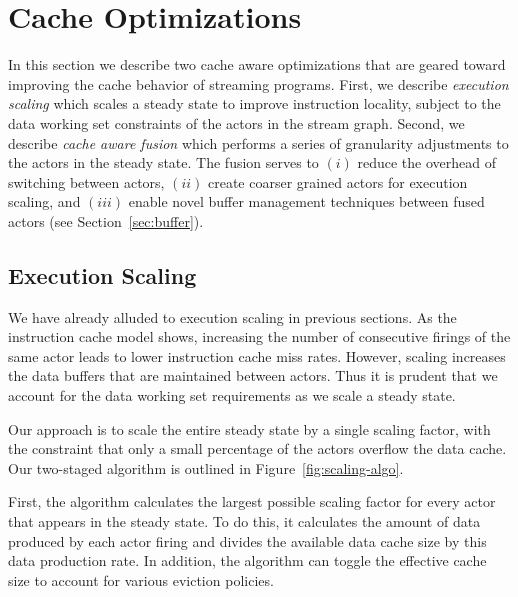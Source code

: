 \documentclass{sigplanconf}
\begin{document}


\section{Cache Optimizations}
\label{sec:cache-opt}

In this section we describe two cache aware optimizations that
are geared toward improving the cache behavior of streaming programs. First, we
describe {\it execution scaling} which 
scales a steady state to improve instruction locality, subject to the
data working set constraints of the actors in the stream graph.
Second, we describe {\it cache aware fusion} which performs a series
of granularity adjustments to the actors in the steady state. The
fusion serves to $(i)$ reduce
the overhead of switching between actors, $(ii)$ create coarser
grained actors for execution scaling, and $(iii)$ enable novel
buffer management techniques between fused actors (see Section~\ref{sec:buffer}).

\subsection{Execution Scaling}
We have already alluded to execution scaling in previous
sections. As the instruction cache model shows, increasing the number
of consecutive firings of the same actor leads to lower instruction
cache miss rates. However, scaling increases the data buffers that are
maintained between actors. Thus it is prudent that we account for the
data working set requirements as we scale a steady state.

Our approach is to scale the entire steady state by a single
scaling factor, with the constraint that only a small percentage
of the actors overflow the data cache. Our two-staged algorithm is
outlined in Figure~\ref{fig:scaling-algo}.

First, the algorithm calculates the largest possible scaling factor
for every actor that appears in the steady state. To do this, it calculates the
amount of data produced by each actor firing and divides the available
data cache size by this data production rate. In addition, the
algorithm can toggle the effective cache size to account for various
eviction policies.
\end{document}
